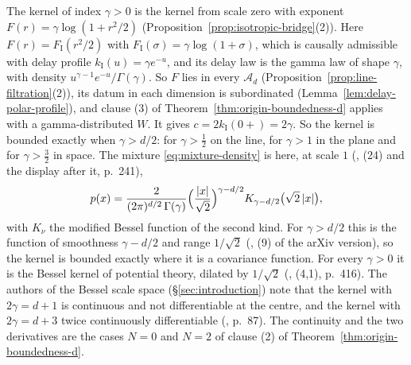 \begin{example}\label{ex:matern}
The \Matern{} kernel of index $\gamma > 0$ is the kernel from scale zero with exponent
$F(r) = \gamma\log(1 + r^2/2)$ (Proposition~\ref{prop:isotropic-bridge}(2)). Here
$F(r) = F_{\mathrm I}(r^2/2)$ with $F_{\mathrm I}(\sigma) = \gamma\log(1+\sigma)$, which is
causally admissible with delay profile $k_{\mathrm I}(u) = \gamma e^{-u}$, and its delay law is
the gamma law of shape $\gamma$, with density $u^{\gamma-1}e^{-u}/\Gamma(\gamma)$. So $F$ lies in
every $\mathcal{A}_d$ (Proposition~\ref{prop:line-filtration}(2)), its datum in each dimension
is subordinated (Lemma~\ref{lem:delay-polar-profile}), and clause (3) of
Theorem~\ref{thm:origin-boundedness-d} applies with a gamma-distributed $W$. It gives
$c = 2k_{\mathrm I}(0{+}) = 2\gamma$. So the kernel is bounded exactly when $\gamma > d/2$: for
$\gamma > \tfrac12$ on the line, for $\gamma > 1$ in the plane and for $\gamma > \tfrac32$ in
space. The mixture \ref{eq:mixture-density} is here, at scale $1$
(, (24) and the display after it, p.~241),
\begin{equation}\label{eq:matern-density}
  p(x) = \frac{2}{(2\pi)^{d/2}\,\Gamma(\gamma)}
    \Bigl(\frac{|x|}{\sqrt2}\Bigr)^{\gamma - d/2} K_{\gamma - d/2}\bigl(\sqrt2\,|x|\bigr) ,
\end{equation}
with $K_\nu$ the modified Bessel function of the second kind. For $\gamma > d/2$ this is the
\Matern{} function of smoothness $\gamma - d/2$ and range $1/\sqrt2$ (,
(9) of the arXiv version), so the kernel is bounded exactly where it is a \Matern{} covariance
function. For every $\gamma > 0$ it is the Bessel kernel of potential theory, dilated by
$1/\sqrt2$ (, (4,1), p.~416). The authors of the Bessel scale
space (\S\ref{sec:introduction}) note that the
kernel with $2\gamma = d + 1$ is continuous and not differentiable at the centre, and the kernel
with $2\gamma = d + 3$ twice continuously differentiable (, p.~87).
The continuity and the two derivatives are the cases $N = 0$ and $N = 2$
of clause (2) of Theorem~\ref{thm:origin-boundedness-d}.


\end{example}
